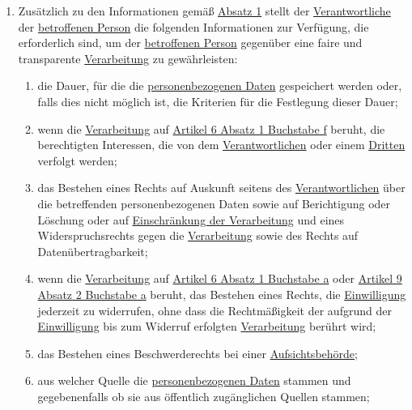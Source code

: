 \begin{enumerate}
\begin{enumerate}
  \end{enumerate}

  \item Zusätzlich zu den Informationen gemäß \hyperref[itm:14-1]{Absatz 1} stellt der \hyperref[itm:04-7]
   {Verantwortliche} der \hyperref[itm:04-1]{betroffenen Person} die folgenden Informationen zur Verfügung, die
   erforderlich sind, um der \hyperref[itm:04-1]{betroffenen Person} gegenüber eine faire und transparente \hyperref
   [itm:04-2]{Verarbeitung} zu gewährleisten:
  \label{itm:14-2}

  \begin{enumerate}
  
    \item die Dauer, für die die \hyperref[itm:04-1]{personenbezogenen Daten} gespeichert werden oder, falls dies nicht
     möglich ist, die Kriterien für die Festlegung dieser Dauer;
    \label{itm:14-2a}

    \item wenn die \hyperref[itm:04-2]{Verarbeitung} auf \hyperref[itm:06-1f]{Artikel 6 Absatz 1 Buchstabe f} beruht,
     die berechtigten Interessen, die von dem \hyperref[itm:04-7]{Verantwortlichen} oder einem \hyperref[itm:04-10]
     {Dritten} verfolgt werden;
    \label{itm:14-2b}

    \item das Bestehen eines Rechts auf Auskunft seitens des \hyperref[itm:04-7]{Verantwortlichen} über die betreffenden
     personenbezogenen Daten sowie auf Berichtigung oder Löschung oder auf \hyperref[itm:04-3]{Einschränkung der
     Verarbeitung} und eines Widerspruchsrechts gegen die \hyperref[itm:04-2]{Verarbeitung} sowie des Rechts auf
     Datenübertragbarkeit;
    \label{itm:14-2c}

    \item wenn die \hyperref[itm:04-2]{Verarbeitung} auf \hyperref[itm:06-1a]{Artikel 6 Absatz 1 Buchstabe a}
     oder \hyperref[itm:09-2a]{Artikel 9 Absatz 2 Buchstabe a} beruht, das Bestehen eines Rechts, die \hyperref
     [itm:04-11]{Einwilligung} jederzeit zu widerrufen, ohne dass die Rechtmäßigkeit der aufgrund der \hyperref
     [itm:04-11]{Einwilligung} bis zum Widerruf erfolgten \hyperref[itm:04-2]{Verarbeitung} berührt wird;
    \label{itm:14-2d}

    \item das Bestehen eines Beschwerderechts bei einer \hyperref[itm:04-21]{Aufsichtsbehörde};
    \label{itm:14-2e}

    \item aus welcher Quelle die \hyperref[itm:04-1]{personenbezogenen Daten} stammen und gegebenenfalls ob sie aus
     öffentlich zugänglichen Quellen stammen;
    \label{itm:14-2f}


\end{enumerate}
\end{enumerate}
